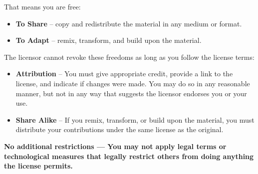    \scriptsize
   \noindent
    That means you are free:
      \begin{itemize}
        \setlength{\itemsep}{0pt}
        \setlength{\parskip}{0pt}
        \setlength{\parsep}{0pt} 
          \item \textbf{To Share} -- copy and redistribute the material in any medium or format.
         \item \textbf{To Adapt} -- remix, transform, and build upon the material.
      \end{itemize}
    The licensor cannot revoke these freedoms as long as you follow the license terms: \par
      \begin{itemize}
        \setlength{\itemsep}{0pt}
        \setlength{\parskip}{0pt}
        \setlength{\parsep}{0pt}
          \item \textbf{Attribution} -- You must give appropriate credit, provide a link to the license, and indicate if changes were made. You may do so in any reasonable manner, but not in any way that suggests the licensor endorses you or your use. \par
          \item \textbf{Share Alike} -- If you remix, transform, or build upon the material, you must distribute your contributions under the same license as the original. \par
      \end{itemize}
    \textbf{No additional restrictions — You may not apply legal terms or technological measures that legally restrict others from doing anything the license permits.}

    \normalfont
    \normalsize

\clearpage